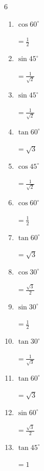 \begin{multicols}{6}
\begin{enumerate}
  \item $\displaystyle \cos{60^\circ}$

        $\displaystyle =\frac{1}{2}$

  \item $\displaystyle \sin{45^\circ}$

        $\displaystyle =\frac{1}{\sqrt{2}}$

  \item $\displaystyle \sin{45^\circ}$

        $\displaystyle =\frac{1}{\sqrt{2}}$

\columnbreak %

  \item $\displaystyle \tan{60^\circ}$

        $\displaystyle =\sqrt{3}$

  \item $\displaystyle \cos{45^\circ}$

        $\displaystyle =\frac{1}{\sqrt{2}}$

  \item $\displaystyle \cos{60^\circ}$

        $\displaystyle =\frac{1}{2}$

  \item $\displaystyle \tan{60^\circ}$

        $\displaystyle =\sqrt{3}$

  \item $\displaystyle \cos{30^\circ}$

        $\displaystyle =\frac{\sqrt{3}}{2}$

  \item $\displaystyle \sin{30^\circ}$

        $\displaystyle =\frac{1}{2}$

  \item $\displaystyle \tan{30^\circ}$

        $\displaystyle =\frac{1}{\sqrt{3}}$

  \item $\displaystyle \tan{60^\circ}$

        $\displaystyle =\sqrt{3}$

  \item $\displaystyle \sin{60^\circ}$

        $\displaystyle =\frac{\sqrt{3}}{2}$

  \item $\displaystyle \tan{45^\circ}$

        $\displaystyle =1$


\end{enumerate}
\end{multicols}

